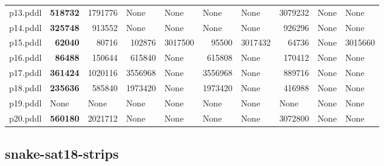 \documentclass{article}
\begin{document}
\begin{tabular}{@{}lrrrrrrrrr@{}}
p13.pddl & \textbf{518732} & 1791776 & \multicolumn{1}{|l|}{None} & \multicolumn{1}{|l|}{None} & \multicolumn{1}{|l|}{None} & \multicolumn{1}{|l|}{None} & 3079232 & \multicolumn{1}{|l|}{None} & \multicolumn{1}{|l|}{None} \\
p14.pddl & \textbf{325748} & 913552 & \multicolumn{1}{|l|}{None} & \multicolumn{1}{|l|}{None} & \multicolumn{1}{|l|}{None} & \multicolumn{1}{|l|}{None} & 926296 & \multicolumn{1}{|l|}{None} & \multicolumn{1}{|l|}{None} \\
p15.pddl & \textbf{62040} & 80716 & 102876 & 3017500 & 95500 & 3017432 & 64736 & \multicolumn{1}{|l|}{None} & 3015660 \\
p16.pddl & \textbf{86488} & 150644 & 615840 & \multicolumn{1}{|l|}{None} & 615808 & \multicolumn{1}{|l|}{None} & 170412 & \multicolumn{1}{|l|}{None} & \multicolumn{1}{|l|}{None} \\
p17.pddl & \textbf{361424} & 1020116 & 3556968 & \multicolumn{1}{|l|}{None} & 3556968 & \multicolumn{1}{|l|}{None} & 889716 & \multicolumn{1}{|l|}{None} & \multicolumn{1}{|l|}{None} \\
p18.pddl & \textbf{235636} & 585840 & 1973420 & \multicolumn{1}{|l|}{None} & 1973420 & \multicolumn{1}{|l|}{None} & 416988 & \multicolumn{1}{|l|}{None} & \multicolumn{1}{|l|}{None} \\
p19.pddl & \multicolumn{1}{|l|}{None} & \multicolumn{1}{|l|}{None} & \multicolumn{1}{|l|}{None} & \multicolumn{1}{|l|}{None} & \multicolumn{1}{|l|}{None} & \multicolumn{1}{|l|}{None} & \multicolumn{1}{|l|}{None} & \multicolumn{1}{|l|}{None} & \multicolumn{1}{|l|}{None} \\
p20.pddl & \textbf{560180} & 2021712 & \multicolumn{1}{|l|}{None} & \multicolumn{1}{|l|}{None} & \multicolumn{1}{|l|}{None} & \multicolumn{1}{|l|}{None} & 3072800 & \multicolumn{1}{|l|}{None} & \multicolumn{1}{|l|}{None} \\
\end{tabular}

\hypertarget{search_start_memory-snake-sat18-strips}{}
\subsection*{snake-sat18-strips}
\end{document}
